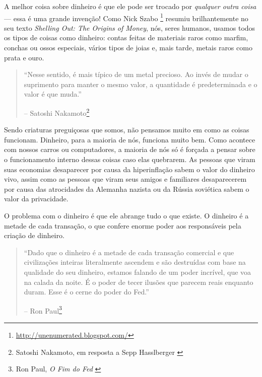 A melhor coisa sobre dinheiro é que ele pode ser trocado por \textit{qualquer outra coisa} --- essa é uma grande invenção! Como Nick Szabo \footnote{\url{http://unenumerated.blogspot.com/}} resumiu brilhantemente no seu texto \textit{Shelling Out: The Origins of Money}\cite{shelling-out}, nós, seres humanos, usamos todos os tipos de coisas como dinheiro: contas feitas de materiais raros como marfim, conchas ou ossos especiais, vários tipos de joias e, mais tarde, metais raros como prata e ouro.

\begin{quotation}\begin{samepage}
\enquote{Nesse sentido, é mais típico de um metal precioso. Ao invés de
mudar o suprimento para manter o mesmo valor, a quantidade é
predeterminada e o valor é que muda.}
\begin{flushright} -- Satoshi Nakamoto\footnote{Satoshi Nakamoto, em resposta a Sepp Hasslberger \cite{satoshi-precious-metal}}
\end{flushright}\end{samepage}\end{quotation}

Sendo criaturas preguiçosas que somos, não pensamos muito em como as coisas funcionam. Dinheiro, para a maioria de nós, funciona muito bem. Como acontece com nossos carros ou computadores, a maioria de nós só é forçada a pensar sobre o funcionamento interno dessas coisas caso elas quebrarem. As pessoas que viram suas economias desaparecer por causa da hiperinflação sabem o valor do dinheiro vivo, assim como as pessoas que viram seus amigos e familiares desaparecerem por causa das atrocidades da Alemanha nazista ou da Rússia soviética sabem o valor da privacidade.

O problema com o dinheiro é que ele abrange tudo o que existe. O dinheiro é a metade de cada transação, o que confere enorme poder aos responsáveis pela criação de dinheiro.

\begin{quotation}\begin{samepage}
\enquote{Dado que o dinheiro é a metade de cada transação comercial e que civilizações inteiras literalmente ascendem e são destruídas com base na qualidade do seu dinheiro, estamos falando de um poder incrível, que voa na calada da noite. É o poder de tecer ilusões que parecem reais enquanto duram. Esse é o cerne do poder do Fed.}
\begin{flushright} -- Ron Paul\footnote{Ron Paul, \textit{O Fim do Fed} \cite{end-the-fed}}
\end{flushright}\end{samepage}\end{quotation}

